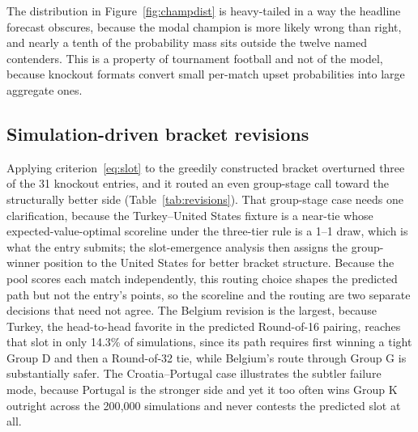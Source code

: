 \documentclass[11pt,letterpaper]{article}
\begin{document}
The distribution in Figure~\ref{fig:champdist} is heavy-tailed in a way the headline forecast obscures, because the modal champion is more likely wrong than right, and nearly a tenth of the probability mass sits outside the twelve named contenders. This is a property of tournament football and not of the model, because knockout formats convert small per-match upset probabilities into large aggregate ones.

\subsection{Simulation-driven bracket revisions}

Applying criterion~\eqref{eq:slot} to the greedily constructed bracket overturned three of the 31 knockout entries, and it routed an even group-stage call toward the structurally better side (Table~\ref{tab:revisions}). That group-stage case needs one clarification, because the Turkey--United States fixture is a near-tie whose expected-value-optimal scoreline under the three-tier rule is a 1--1 draw, which is what the entry submits; the slot-emergence analysis then assigns the group-winner position to the United States for better bracket structure. Because the pool scores each match independently, this routing choice shapes the predicted path but not the entry's points, so the scoreline and the routing are two separate decisions that need not agree. The Belgium revision is the largest, because Turkey, the head-to-head favorite in the predicted Round-of-16 pairing, reaches that slot in only 14.3\% of simulations, since its path requires first winning a tight Group D and then a Round-of-32 tie, while Belgium's route through Group G is substantially safer. The Croatia--Portugal case illustrates the subtler failure mode, because Portugal is the stronger side and yet it too often wins Group K outright across the 200{,}000 simulations and never contests the predicted slot at all.
\end{document}
